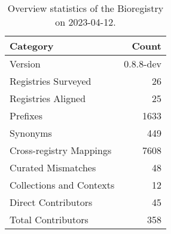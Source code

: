 \begin{table}
\caption{Overview statistics of the Bioregistry on 2023-04-12.}
\label{tab:bioregistry-summary}
\begin{tabular}{lr}
\toprule
Category & Count \\
\midrule
Version & 0.8.8-dev \\
Registries Surveyed & 26 \\
Registries Aligned & 25 \\
Prefixes & 1633 \\
Synonyms & 449 \\
Cross-registry Mappings & 7608 \\
Curated Mismatches & 48 \\
Collections and Contexts & 12 \\
Direct Contributors & 45 \\
Total Contributors & 358 \\
\bottomrule
\end{tabular}
\end{table}
